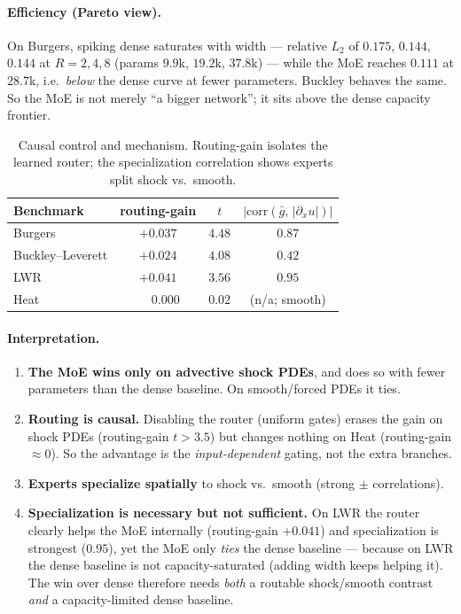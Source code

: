 \documentclass[11pt]{article}
\begin{document}
\paragraph{Efficiency (Pareto view).} On Burgers, spiking dense saturates with width --- relative
$L_2$ of $0.175$, $0.144$, $0.144$ at $R{=}2,4,8$ (params $9.9$k, $19.2$k, $37.8$k) --- while the
MoE reaches $0.111$ at $28.7$k, i.e.\ \emph{below} the dense curve at fewer parameters. Buckley behaves
the same. So the MoE is not merely ``a bigger network''; it sits above the dense capacity frontier.

\begin{table}[h]\centering
\caption{Causal control and mechanism. Routing-gain isolates the learned router; the specialization
correlation shows experts split shock vs.\ smooth.}
\begin{tabular}{lccc}
\toprule
Benchmark & routing-gain & $t$ & $|\mathrm{corr}(\bar g,\,|\partial_x u|)|$\\
\midrule
Burgers            & $+0.037$ & $4.48$ & $0.87$\\
Buckley--Leverett  & $+0.024$ & $4.08$ & $0.42$\\
LWR                & $+0.041$ & $3.56$ & $0.95$\\
Heat               & $\phantom{+}0.000$ & $0.02$ & (n/a; smooth)\\
\bottomrule
\end{tabular}
\end{table}

\paragraph{Interpretation.}
\begin{enumerate}[leftmargin=*,itemsep=2pt]
\item \textbf{The MoE wins only on advective shock PDEs}, and does so with fewer parameters than the
      dense baseline. On smooth/forced PDEs it ties.
\item \textbf{Routing is causal.} Disabling the router (uniform gates) erases the gain on shock PDEs
      (routing-gain $t>3.5$) but changes nothing on Heat (routing-gain $\approx 0$). So the advantage
      is the \emph{input-dependent} gating, not the extra branches.
\item \textbf{Experts specialize spatially} to shock vs.\ smooth (strong $\pm$ correlations).
\item \textbf{Specialization is necessary but not sufficient.} On LWR the router clearly helps the
      MoE internally (routing-gain $+0.041$) and specialization is strongest ($0.95$), yet the MoE
      only \emph{ties} the dense baseline --- because on LWR the dense baseline is not
      capacity-saturated (adding width keeps helping it). The win over dense therefore needs
      \emph{both} a routable shock/smooth contrast \emph{and} a capacity-limited dense baseline.
\end{enumerate}
\end{document}
